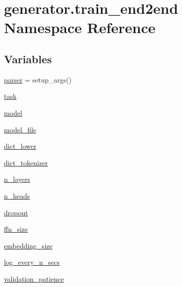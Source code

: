 \hypertarget{namespacegenerator_1_1train__end2end}{}\section{generator.\+train\+\_\+end2end Namespace Reference}
\label{namespacegenerator_1_1train__end2end}
\subsection*{Variables}
\begin{DoxyCompactItemize}
\item 
\hyperlink{namespacegenerator_1_1train__end2end_a41141ea896397c7af71586c982e8f0fa}{parser} = setup\+\_\+args()
\item 
\hyperlink{namespacegenerator_1_1train__end2end_a8640d5f9a35c3b3b53596daa85e65f55}{task}
\item 
\hyperlink{namespacegenerator_1_1train__end2end_aa419eed190903c20903668543fb3deb6}{model}
\item 
\hyperlink{namespacegenerator_1_1train__end2end_a49d9610b9e0ca1fc9730f830d5536f0d}{model\+\_\+file}
\item 
\hyperlink{namespacegenerator_1_1train__end2end_a7a063e1270b0fcdfed5745022a4a1f96}{dict\+\_\+lower}
\item 
\hyperlink{namespacegenerator_1_1train__end2end_a06a0966b2ece63731a0d0775e9f83d6c}{dict\+\_\+tokenizer}
\item 
\hyperlink{namespacegenerator_1_1train__end2end_a5bddfd8f3783727cc9a1f989d3d65ef7}{n\+\_\+layers}
\item 
\hyperlink{namespacegenerator_1_1train__end2end_a8b8d91f81c55c3ecc51057bb6211ca48}{n\+\_\+heads}
\item 
\hyperlink{namespacegenerator_1_1train__end2end_a009a62dfd32fd2658851573bc0593c52}{dropout}
\item 
\hyperlink{namespacegenerator_1_1train__end2end_a5e62c9005a7dddc1d7f56db03c964e29}{ffn\+\_\+size}
\item 
\hyperlink{namespacegenerator_1_1train__end2end_ac68ea9c5aba63cfec200c37319f03b05}{embedding\+\_\+size}
\item 
\hyperlink{namespacegenerator_1_1train__end2end_acc869a6596ad579292f65e7bbf53fa7d}{log\+\_\+every\+\_\+n\+\_\+secs}
\item 
\hyperlink{namespacegenerator_1_1train__end2end_a5c869e98e17e916e92ab781bc68ff8c5}{validation\+\_\+patience}
\item 

\end{DoxyCompactItemize}
